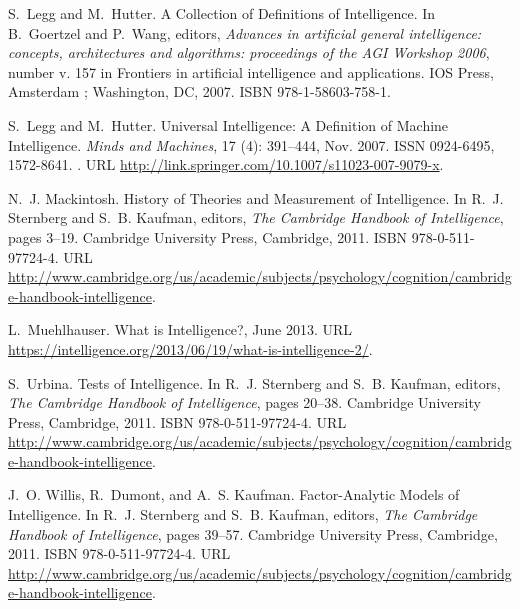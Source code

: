 \begin{thebibliography}{11}
S.~Legg and M.~Hutter.
\newblock A {Collection} of {Definitions} of {Intelligence}.
\newblock In B.~Goertzel and P.~Wang, editors, \emph{Advances in artificial
  general intelligence: concepts, architectures and algorithms: proceedings of
  the {AGI} {Workshop} 2006}, number v. 157 in Frontiers in artificial
  intelligence and applications. IOS Press, Amsterdam ; Washington, DC,
  2007{}.
\newblock ISBN 978-1-58603-758-1.

S.~Legg and M.~Hutter.
\newblock Universal {Intelligence}: {A} {Definition} of {Machine}
  {Intelligence}.
\newblock \emph{Minds and Machines}, 17 (4): 391--444, Nov.
  2007{}.
\newblock ISSN 0924-6495, 1572-8641.
\newblock {}.
\newblock URL \url{http://link.springer.com/10.1007/s11023-007-9079-x}.

N.~J. Mackintosh.
\newblock History of {Theories} and {Measurement} of {Intelligence}.
\newblock In R.~J. Sternberg and S.~B. Kaufman, editors, \emph{The {Cambridge}
  {Handbook} of {Intelligence}}, pages 3--19. Cambridge University Press,
  Cambridge, 2011.
\newblock ISBN 978-0-511-97724-4.
\newblock URL
  \url{http://www.cambridge.org/us/academic/subjects/psychology/cognition/cambridge-handbook-intelligence}.

L.~Muehlhauser.
\newblock What is {Intelligence}?, June 2013.
\newblock URL
  \url{https://intelligence.org/2013/06/19/what-is-intelligence-2/}.

S.~Urbina.
\newblock Tests of {Intelligence}.
\newblock In R.~J. Sternberg and S.~B. Kaufman, editors, \emph{The {Cambridge}
  {Handbook} of {Intelligence}}, pages 20--38. Cambridge University Press,
  Cambridge, 2011.
\newblock ISBN 978-0-511-97724-4.
\newblock URL
  \url{http://www.cambridge.org/us/academic/subjects/psychology/cognition/cambridge-handbook-intelligence}.

J.~O. Willis, R.~Dumont, and A.~S. Kaufman.
\newblock Factor-{Analytic} {Models} of {Intelligence}.
\newblock In R.~J. Sternberg and S.~B. Kaufman, editors, \emph{The {Cambridge}
  {Handbook} of {Intelligence}}, pages 39--57. Cambridge University Press,
  Cambridge, 2011.
\newblock ISBN 978-0-511-97724-4.
\newblock URL
  \url{http://www.cambridge.org/us/academic/subjects/psychology/cognition/cambridge-handbook-intelligence}.

\end{thebibliography}
